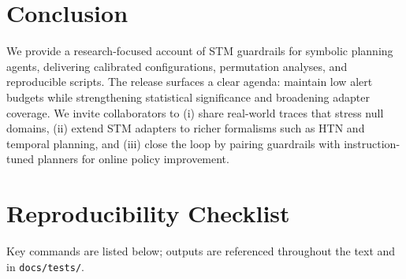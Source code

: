 \documentclass[11pt]{article}
\begin{document}
\section{Conclusion}
We provide a research-focused account of STM guardrails for symbolic planning
agents, delivering calibrated configurations, permutation analyses, and
reproducible scripts. The release surfaces a clear agenda: maintain low alert
budgets while strengthening statistical significance and broadening adapter
coverage. We invite collaborators to (i) share real-world traces that stress
null domains, (ii) extend STM adapters to richer formalisms such as HTN and
temporal planning, and (iii) close the loop by pairing guardrails with
instruction-tuned planners for online policy improvement.

\appendix

\section{Reproducibility Checklist}
Key commands are listed below; outputs are referenced throughout the text and in
\texttt{docs/tests/}.
\end{document}
